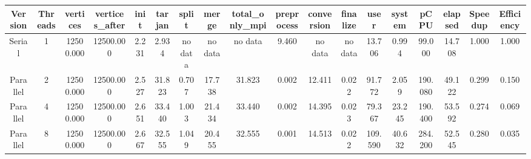 \begin{tabular}{|c|c|c|c|c|c|c|c|c|c|c|c|c|c|c|c|c|c|}
\toprule
 Version &  Threads &  vertices &  vertices\_after &  init &  tarjan &   split &   merge & total\_only\_mpi &  preprocess & conversion & finalize &    user &  system &    pCPU &  elapsed &  Speedup &  Efficiency \\
\midrule
  Serial &        1 & 12500.000 &       12500.000 & 2.231 &   2.934 & no data & no data &        no data &       9.460 &    no data &  no data &  13.706 &   0.994 &  99.000 &   14.708 &    1.000 &       1.000 \\
Parallel &        2 & 12500.000 &       12500.000 & 2.527 &  31.823 &   0.707 &  17.738 &         31.823 &       0.002 &     12.411 &    0.022 &  91.772 &   2.059 & 190.080 &   49.122 &    0.299 &       0.150 \\
Parallel &        4 & 12500.000 &       12500.000 & 2.651 &  33.440 &   1.003 &  21.434 &         33.440 &       0.002 &     14.395 &    0.023 &  79.367 &  23.245 & 190.400 &   53.592 &    0.274 &       0.069 \\
Parallel &        8 & 12500.000 &       12500.000 & 2.667 &  32.555 &   1.049 &  20.455 &         32.555 &       0.001 &     14.513 &    0.022 & 109.590 &  40.632 & 284.200 &   52.545 &    0.280 &       0.035 \\
\bottomrule
\end{tabular}
